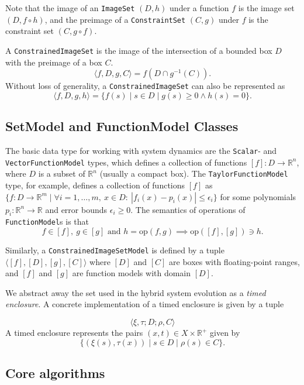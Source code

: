 \documentclass[english,a4paper]{article}
\newcommand{\R}{\mathbb{R}}
\theoremstyle{theorem}
\theoremstyle{definition}
\theoremstyle{remark}
\begin{document}
Note that the image of an \texttt{ImageSet} $(D,h)$ under a function $f$ is the image set $(D,f\circ h)$, and the preimage of a \texttt{ConstraintSet} $(C,g)$ under $f$ is the constraint set $(C,g\circ f)$.

A \texttt{ConstrainedImageSet} is the image of the intersection of a bounded box $D$ with the preimage of a box $C$.
\[ \langle f,D,g,C\rangle = f(D\cap g^{-1}(C)) . \]
Without loss of generality, a \texttt{ConstrainedImageSet} can also be represented as
\[ \langle f,D,g,h\rangle = \{ f(s) \mid s\in D \mid g(s) \geq 0 \wedge h(s)=0 \} . \]

\subsection{SetModel and FunctionModel Classes}

The basic data type for working with system dynamics are the \texttt{Scalar}- and \texttt{VectorFunctionModel} types, which defines a collection of functions $[f]:D\rightarrow \R^n$, where $D$ is a subset of $\R^n$ (usually a compact box). The \texttt{TaylorFunctionModel} type, for example, defines a collection of functions $[f]$ as $\{ f:D\rightarrow\R^m \mid \forall i=1,\ldots,m,\ x\in D:\ |f_i(x)-p_i(x)| \leq \epsilon_i\}$ for some polynomials $p_i:\R^n\rightarrow\R$ and error bounds $\epsilon_i\geq0$. The semantics of operations of \texttt{FunctionModel}s is that
$$ f\in[f],\ g\in[g]  \text{ and } h=\mathrm{op}(f,g) \implies \mathrm{op}([f],[g])\ni h . $$

Similarly, a \texttt{ConstrainedImageSetModel} is defined by a tuple $\langle [f],[D],[g],[C]\rangle$ where $[D]$ and $[C]$ are boxes with floating-point ranges, and $[f]$ and $[g]$ are function models with domain $[D]$.

We abstract away the set used in the hybrid system evolution as a \emph{timed enclosure}.
A concrete implementation of a timed enclosure is given by a tuple 

$$ \langle \xi, \tau ; D ; \rho, C \rangle $$
A timed enclosure represents the pairs $(x,t) \in X\times \R^+$ given by $$\{ (\xi(s),\tau(x)) \mid s\in D \mid \rho(s)\in C \}.$$


\subsection{Core algorithms}
\end{document}
